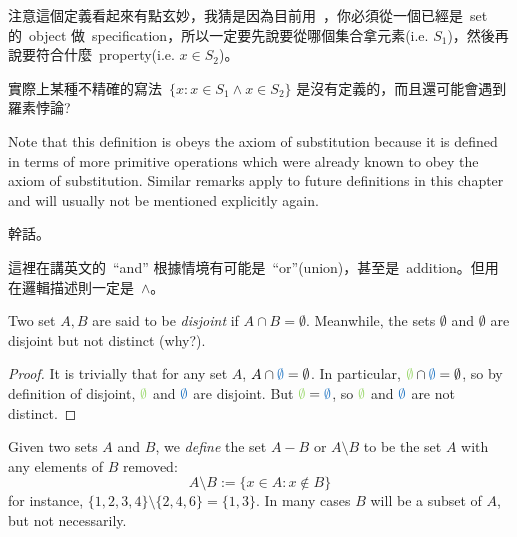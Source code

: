 \begin{note}
注意這個定義看起來有點玄妙，我猜是因為目前用\ ，你必須從一個已經是\ set 的\ object 做\ specification，所以一定要先說要從哪個集合拿元素(i.e. \(S_1\))，然後再說要符合什麼\ property(i.e. \(x \in S_2\))。

實際上某種不精確的寫法\ \( \{ x : x \in S_1 \land x \in S_2 \} \) 是沒有定義的，而且還可能會遇到羅素悖論?
\end{note}

\begin{remark} \label{remark 3.1.24}
Note that this definition is obeys the axiom of substitution  because it is defined in terms of more primitive operations which were already known to obey the axiom of substitution. Similar remarks apply to future definitions in this chapter and will usually not be mentioned explicitly again.
\end{remark}

\begin{example}
幹話。
\end{example}

\begin{remark} \label{remark 3.1.26}
這裡在講英文的\ ``and'' 根據情境有可能是\ ``or''(union)，甚至是\ addition。但用在邏輯描述則一定是\ \(\land\)。
\end{remark}

\begin{note}
Two set \(A, B\) are said to be \emph{disjoint} if \(A \cap B = \emptyset\). Meanwhile, the sets \(\emptyset\) and \(\emptyset\) are disjoint but not distinct (why?).
\end{note}

\begin{proof}
It is trivially that for any set \(A\), \(A \cap \BLUE{\emptyset} = \emptyset\). In particular, \(\GREEN{\emptyset} \cap \BLUE{\emptyset} = \emptyset\), so by definition of disjoint, \(\GREEN{\emptyset}\) and \(\BLUE{\emptyset}\) are disjoint. But \(\GREEN{\emptyset} = \BLUE{\emptyset}\), so \(\GREEN{\emptyset}\) and \(\BLUE{\emptyset}\) are not distinct.
\end{proof}

\begin{definition}  \label{def 3.1.27}
Given two sets \(A\) and \(B\), we \emph{define} the set \(A − B\) or \(A \setminus B\) to be the set \(A\) with any elements of \(B\) removed:
\[
A \setminus B := \{ x \in A : x \notin B \}
\]
for instance, \( \{ 1, 2, 3, 4 \} \setminus \{ 2, 4, 6 \}  = \{ 1, 3 \} \). In many cases \(B\) will be a subset of \(A\), but not necessarily.
\end{definition}

